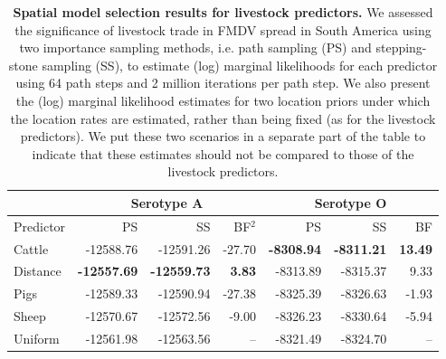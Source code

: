 \documentclass[10pt]{article}
\begin{document}
\begin{table}[H]
\caption{
\textbf{Spatial model selection results for livestock predictors.}
We assessed the significance of livestock trade in FMDV spread in South America using two importance sampling methods, i.e. path sampling (PS) and stepping-stone sampling (SS), to estimate (log) marginal likelihoods for each predictor using 64 path steps and 2 million iterations per path step.
We also present the (log) marginal likelihood estimates for two location priors under which the location rates are estimated, rather than being fixed (as for the livestock predictors).
We put these two scenarios in a separate part of the table to indicate that these estimates should not be compared to those of the livestock predictors.
}
\begin{center}
\begin{tabular}{lrrrrrr}
\toprule
 & \multicolumn{3}{c}{Serotype A}& \multicolumn{3}{c}{Serotype O}\\
 \midrule
Predictor & PS & SS & BF$^2$ & PS & SS & BF \\
Cattle&-12588.76&-12591.26&-27.70&\textbf{-8308.94}&\textbf{-8311.21}& \textbf{13.49}\\
Distance&\textbf{-12557.69}&\textbf{-12559.73}&\textbf{3.83}&-8313.89&-8315.37&9.33\\
Pigs&-12589.33&-12590.94&-27.38&-8325.39&-8326.63&-1.93\\
Sheep&-12570.67&-12572.56&-9.00&-8326.23&-8330.64&-5.94\\
Uniform&-12561.98&-12563.56&--&-8321.49&-8324.70&--\\
\bottomrule
\end{tabular}
\end{center}
\begin{flushleft}
\end{flushleft}
\label{tab:preds}
 \end{table}
\end{document}
